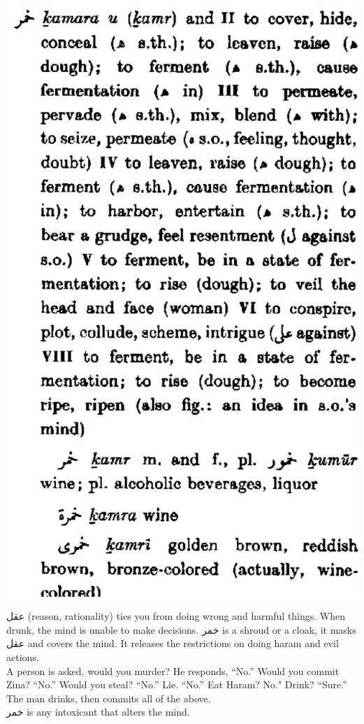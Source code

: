 \documentclass[
]{book}
\begin{document}
\includegraphics{images/khamr.png}

عقل (reason, rationality) ties you from doing wrong and harmful things. When drunk, the mind is unable to make decisions. خمر is a shroud or a cloak, it masks عقل and covers the mind. It releases the restrictions on doing haram and evil actions.\\
A person is asked, would you murder? He responds, ``No.'' Would you commit Zina? ``No.'' Would you steal? ``No.'' Lie. ``No.'' Eat Haram? No." Drink? ``Sure.'' The man drinks, then commits all of the above.\\
خمر is any intoxicant that alters the mind.
\end{document}
